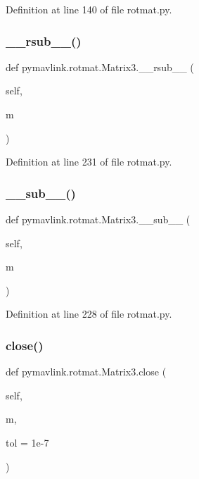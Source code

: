 Definition at line 140 of file rotmat.\+py.

\mbox{\label{classpymavlink_1_1rotmat_1_1Matrix3_a51a04b56f9927d460006b68f5156126c}} 
\subsubsection{\texorpdfstring{\_\_rsub\_\_()}{\_\_rsub\_\_()}}
{\footnotesize\ttfamily def pymavlink.\+rotmat.\+Matrix3.\+\_\+\+\_\+rsub\+\_\+\+\_\+ (\begin{DoxyParamCaption}\item[{}]{self,  }\item[{}]{m }\end{DoxyParamCaption})}



Definition at line 231 of file rotmat.\+py.

\mbox{\label{classpymavlink_1_1rotmat_1_1Matrix3_aaf33cc183b0470c7fa2e20be34bbf1f9}} 
\subsubsection{\texorpdfstring{\_\_sub\_\_()}{\_\_sub\_\_()}}
{\footnotesize\ttfamily def pymavlink.\+rotmat.\+Matrix3.\+\_\+\+\_\+sub\+\_\+\+\_\+ (\begin{DoxyParamCaption}\item[{}]{self,  }\item[{}]{m }\end{DoxyParamCaption})}



Definition at line 228 of file rotmat.\+py.

\mbox{\label{classpymavlink_1_1rotmat_1_1Matrix3_a16559bd4505650c03021ace738bb40f8}} 
\subsubsection{\texorpdfstring{close()}{close()}}
{\footnotesize\ttfamily def pymavlink.\+rotmat.\+Matrix3.\+close (\begin{DoxyParamCaption}\item[{}]{self,  }\item[{}]{m,  }\item[{}]{tol = {\ttfamily 1e-\/7} }\end{DoxyParamCaption})}




